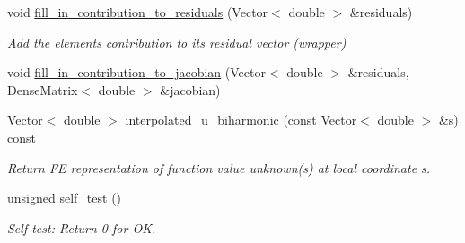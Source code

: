 \begin{DoxyCompactItemize}
\item 
void \hyperlink{classoomph_1_1MyBiharmonicEquations_a2f795bb316c3a9fc749639a8d3f8b5dd}{fill\+\_\+in\+\_\+contribution\+\_\+to\+\_\+residuals} (Vector$<$ double $>$ \&residuals)
\begin{DoxyCompactList}\small\item\em Add the element\textquotesingle{}s contribution to its residual vector (wrapper) \end{DoxyCompactList}\item 
void \hyperlink{classoomph_1_1MyBiharmonicEquations_ad5ef6af62c0ebf27bacf62be8d408c8a}{fill\+\_\+in\+\_\+contribution\+\_\+to\+\_\+jacobian} (Vector$<$ double $>$ \&residuals, Dense\+Matrix$<$ double $>$ \&jacobian)
\item 
Vector$<$ double $>$ \hyperlink{classoomph_1_1MyBiharmonicEquations_ac451e7d6ebf1dd94f0a0c122e3882d53}{interpolated\+\_\+u\+\_\+biharmonic} (const Vector$<$ double $>$ \&s) const
\begin{DoxyCompactList}\small\item\em Return FE representation of function value unknown(s) at local coordinate s. \end{DoxyCompactList}\item 
unsigned \hyperlink{classoomph_1_1MyBiharmonicEquations_a6898ff065e57f8e765440da81075cf3d}{self\+\_\+test} ()
\begin{DoxyCompactList}\small\item\em Self-\/test\+: Return 0 for OK. \end{DoxyCompactList}\end{DoxyCompactItemize}
